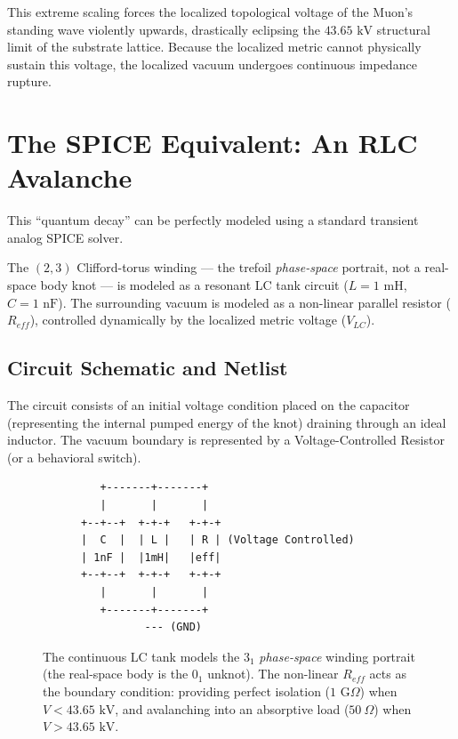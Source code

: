 This extreme scaling forces the localized topological voltage of the Muon's standing wave violently upwards, drastically eclipsing the $43.65 \text{ kV}$ structural limit of the substrate lattice. Because the localized metric cannot physically sustain this voltage, the localized vacuum undergoes continuous impedance rupture.

\section{The SPICE Equivalent: An RLC Avalanche}
This ``quantum decay'' can be perfectly modeled using a standard transient analog SPICE solver. 

The $(2,3)$ Clifford-torus winding --- the trefoil \emph{phase-space} portrait, not a real-space body knot --- is modeled as a resonant LC tank circuit ($L = 1 \text{ mH}$, $C = 1 \text{ nF}$). The surrounding vacuum is modeled as a non-linear parallel resistor ($R_{eff}$), controlled dynamically by the localized metric voltage ($V_{LC}$). 

\subsection{Circuit Schematic and Netlist}
The circuit consists of an initial voltage condition placed on the capacitor (representing the internal pumped energy of the knot) draining through an ideal inductor. The vacuum boundary is represented by a Voltage-Controlled Resistor (or a behavioral switch). 

\begin{figure}[h!]
    \centering
    \begin{tcolorbox}[colback=black!5!white, colframe=black!75!white, title=Simplified LTspice Equivalent Circuit]
    \centering
    \begin{verbatim}
         +-------+-------+
         |       |       |
      +--+--+  +-+-+   +-+-+
      |  C  |  | L |   | R | (Voltage Controlled)
      | 1nF |  |1mH|   |eff|
      +--+--+  +-+-+   +-+-+
         |       |       |
         +-------+-------+
                --- (GND)
    \end{verbatim}
    \end{tcolorbox}
    \caption{The continuous LC tank models the $3_1$ \emph{phase-space} winding portrait (the real-space body is the $0_1$ unknot). The non-linear $R_{eff}$ acts as the boundary condition: providing perfect isolation ($1\text{ G}\Omega$) when $V < 43.65\text{ kV}$, and avalanching into an absorptive load ($50\ \Omega$) when $V > 43.65\text{ kV}$.}
\end{figure}

